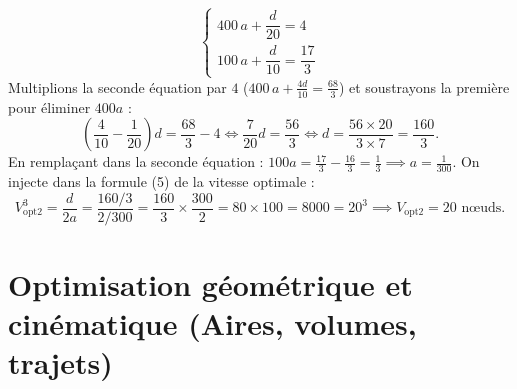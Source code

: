 \begin{exemple}
\begin{itemize}
    \[
        \begin{cases}
            400\,a + \dfrac{d}{20} = 4 \\[6pt]
            100\,a + \dfrac{d}{10} = \dfrac{17}{3}
        \end{cases}
    \]
    Multiplions la seconde équation par $4$ ($400\,a + \frac{4d}{10} = \frac{68}{3}$) et soustrayons la première pour éliminer $400a$ :
    \[
        \left(\frac{4}{10} - \frac{1}{20}\right)d = \frac{68}{3} - 4 \iff \frac{7}{20}d = \frac{56}{3} \iff d = \frac{56 \times 20}{3 \times 7} = \frac{160}{3}.
    \]
    En remplaçant dans la seconde équation : $100a = \frac{17}{3} - \frac{16}{3} = \frac{1}{3} \implies a = \frac{1}{300}$. On injecte dans la formule (5) de la vitesse optimale :
    \[
        V_{\text{opt2}}^3 = \frac{d}{2a} = \frac{160/3}{2/300} = \frac{160}{3} \times \frac{300}{2} = 80 \times 100 = 8000 = 20^3 \implies \boxed{V_{\text{opt2}} = 20\text{ nœuds}}.
    \]
\end{itemize}
\end{exemple}

\section{Optimisation géométrique et cinématique (Aires, volumes, trajets)}

